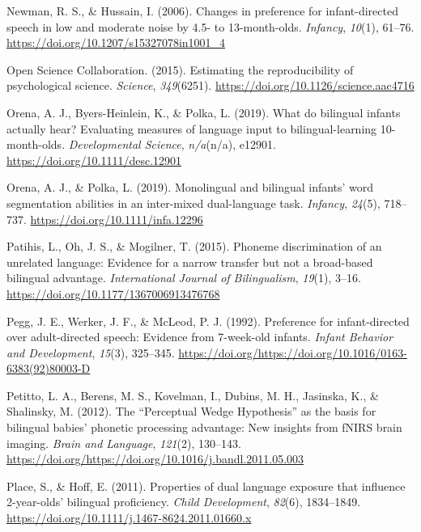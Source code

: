 \documentclass[,man,floatsintext]{apa6}
\begin{document}
\leavevmode\hypertarget{ref-newman_2006}{}%
Newman, R. S., \& Hussain, I. (2006). Changes in preference for infant-directed speech in low and moderate noise by 4.5- to 13-month-olds. \emph{Infancy}, \emph{10}(1), 61--76. \url{https://doi.org/10.1207/s15327078in1001_4}

\leavevmode\hypertarget{ref-open_science_collab_2015}{}%
Open Science Collaboration. (2015). Estimating the reproducibility of psychological science. \emph{Science}, \emph{349}(6251). \url{https://doi.org/10.1126/science.aac4716}

\leavevmode\hypertarget{ref-orena_2019}{}%
Orena, A. J., Byers-Heinlein, K., \& Polka, L. (2019). What do bilingual infants actually hear? Evaluating measures of language input to bilingual-learning 10-month-olds. \emph{Developmental Science}, \emph{n/a}(n/a), e12901. \url{https://doi.org/10.1111/desc.12901}

\leavevmode\hypertarget{ref-orena_polka_2019}{}%
Orena, A. J., \& Polka, L. (2019). Monolingual and bilingual infants' word segmentation abilities in an inter-mixed dual-language task. \emph{Infancy}, \emph{24}(5), 718--737. \url{https://doi.org/10.1111/infa.12296}

\leavevmode\hypertarget{ref-patihis_2015}{}%
Patihis, L., Oh, J. S., \& Mogilner, T. (2015). Phoneme discrimination of an unrelated language: Evidence for a narrow transfer but not a broad-based bilingual advantage. \emph{International Journal of Bilingualism}, \emph{19}(1), 3--16. \url{https://doi.org/10.1177/1367006913476768}

\leavevmode\hypertarget{ref-pegg_1992}{}%
Pegg, J. E., Werker, J. F., \& McLeod, P. J. (1992). Preference for infant-directed over adult-directed speech: Evidence from 7-week-old infants. \emph{Infant Behavior and Development}, \emph{15}(3), 325--345. \url{https://doi.org/https://doi.org/10.1016/0163-6383(92)80003-D}

\leavevmode\hypertarget{ref-petitto_2012}{}%
Petitto, L. A., Berens, M. S., Kovelman, I., Dubins, M. H., Jasinska, K., \& Shalinsky, M. (2012). The ``Perceptual Wedge Hypothesis'' as the basis for bilingual babies' phonetic processing advantage: New insights from fNIRS brain imaging. \emph{Brain and Language}, \emph{121}(2), 130--143. \url{https://doi.org/https://doi.org/10.1016/j.bandl.2011.05.003}

\leavevmode\hypertarget{ref-place_2011}{}%
Place, S., \& Hoff, E. (2011). Properties of dual language exposure that influence 2-year-olds' bilingual proficiency. \emph{Child Development}, \emph{82}(6), 1834--1849. \url{https://doi.org/10.1111/j.1467-8624.2011.01660.x}
\end{document}
